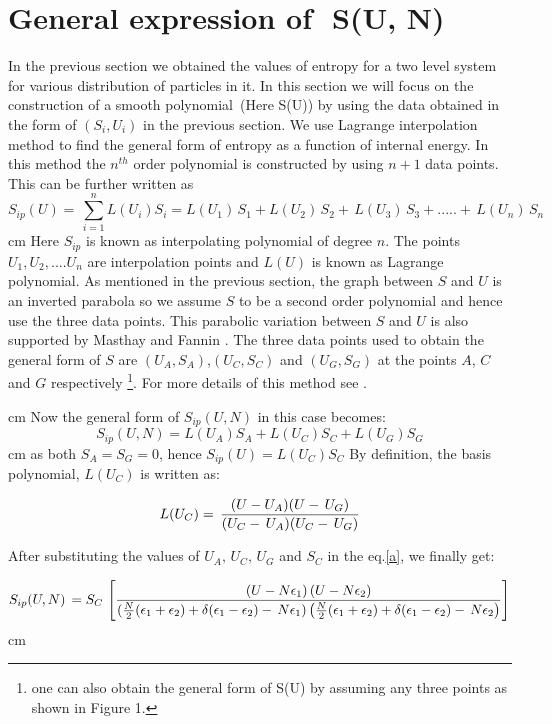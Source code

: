 \documentclass{article}
\begin{document}
\vskip 0.5cm
\section{ General expression of \,\,S(U, N)}

In the previous section we obtained the values of entropy for a two level system  for various distribution of particles in it.  In this section we will focus on the construction of a smooth polynomial\,  (Here S(U))  by using the data  obtained in the form of  $( S_i, U_i)$ in the previous section.
We use Lagrange interpolation method      to find the general form of entropy  as a function of  internal energy. In this method the $n^{th}$ order polynomial is constructed by using $n+1$ data points. 
This can be further written as 
$$ S_{ip}(U) = \, \sum_{i = 1}^{ n} L(U_i)S_i  = L( U_1)\,S_1 + L(U_2)\, S_2 + \, L(U_3) \, S_3 + ..... +\, L(U_n) \, S_n $$ 
 cm
\noindent Here $S_{ip}$ is known as interpolating polynomial of degree $n$. The  points $U_1, U_2, ....U_n$ are interpolation points and $L(U)$  is known as Lagrange polynomial. As mentioned in the previous section,  the graph between $S$ and $U$ is an inverted parabola so we assume $S$ to be a second order polynomial and hence use the three data points. This  parabolic variation between $S$ and $U$ is also supported by Masthay and Fannin {\cite{13}}. The three data points used to obtain the general form of $S$ are $(U_A, S_A)$,$(U_C, S_C)$ and  $(U_G, S_G)$ at the points $A$, $C$ and $G$ respectively {\footnote{one can also obtain the general form of S(U) by assuming any three points as shown in Figure 1.}}.
For more details of this method see {\cite{14}}.

 cm
\noindent Now the general form of $ S_{ip}(U,N)$ in this case becomes:
\begin{equation}
S_{ip}(U, N)  = L(U_A) S_A + L(U_C) S_C + L(U_G) S_G
\label{a}
\end{equation}
 cm
as both $ S_A = S_G = 0$, hence $ S_{ip}(U)  = L(U_C) S_C $
\vskip 0.4cm
By definition, the basis polynomial, $L(U_C)$ is written as:

$$ L(U_C) =\, {{(U - U_A) (U - \, U_G)}\over{(U_C - \, U_A) ( U_C - \, U_G)}}$$

After substituting the values of $U_A,\, U_C, \, U_G$ and $S_C$  in the eq.{\ref{a}}, we finally get:

$$S_{ip}(U, N) \,= S_C \, \left[ {( U - N\epsilon_1) \, ( U - N\epsilon_2) }\over { ( { N \over 2} (\epsilon_1 + \epsilon_2) + \delta (\epsilon_1 - \epsilon_2) - \, N \epsilon_1) \left( { N \over 2} (\epsilon_1 + \epsilon_2) + \delta (\epsilon_1 - \epsilon_2) - \, N \epsilon_2 \right)} \right]$$
 cm
\end{document}
